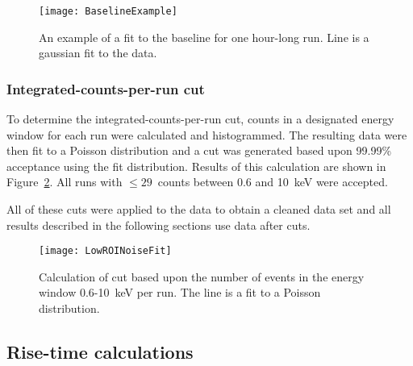 						
				\begin{figure}
					\centering
					\texttt{[image: BaselineExample]}
					\caption[An example of a fit to the baseline for one hour-long run]
					{An example of a fit to the baseline for one hour-long run.  Line is a gaussian fit to the data.}
					\label{fig:PPC2BaselineCuts}
				\end{figure}
				
			\subsubsection{Integrated-counts-per-run cut}
	To determine the integrated-counts-per-run cut, counts in a designated energy window for each run were calculated and histogrammed.  The resulting data were then fit to a Poisson distribution and a cut was generated based upon 99.99\% acceptance using the fit distribution.  Results of this calculation are shown in Figure~\ref{fig:PPC2NoiseCuts}.  All runs with $\leq29$~counts between 0.6 and 10~keV were accepted.  
	
	All of these cuts were applied to the data to obtain a cleaned data set and all results described in the following sections use data after cuts.
	
				\begin{figure}
					\centering
					\texttt{[image: LowROINoiseFit]}
					\caption[Calculation of noise cuts]
					{Calculation of cut based upon the number of events in the energy window 0.6-10~keV per run.  
					The line is a fit to a Poisson distribution.  }
					\label{fig:PPC2NoiseCuts}
				\end{figure}
	
	    	\subsection{Rise-time calculations}
		\label{sec:DeploymentPPC2SoudanAnalysisRisetime}    
	

